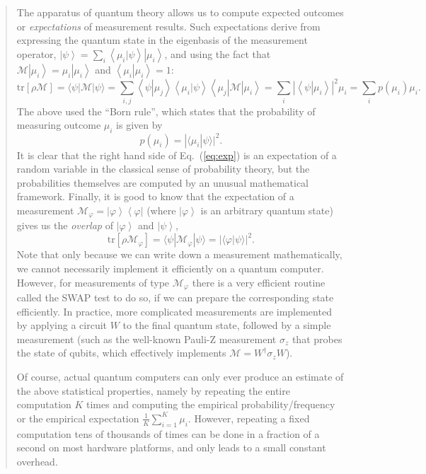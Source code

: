 \documentclass[aps, reprint, onecolumn, nofootinbib, longbibliography]{revtex4-2}
\newcommand{\ket}[1]{\ensuremath{\left| #1 \right \rangle}}
\newcommand{\bra}[1]{\ensuremath{\left \langle #1 \right |}}
\newcommand{\braket}[2]{\ensuremath{\left\langle #1\left|#2 \right.\right\rangle}}
\newcommand{\ketbra}[2]{\ket{#1}\!\bra{#2}}
\newcommand{\tr}[1]{ \mathrm{tr}\left[#1\right] }
\newcommand{\meas}{\mathcal{M}}
\begin{document}
\begin{quote}
    The apparatus of quantum theory allows us to compute expected outcomes or \textit{expectations} of measurement results. Such expectations derive from expressing the quantum state in the eigenbasis of the measurement operator, $\ket{\psi} = \sum_i \braket{\mu_i}{\psi} \ket{\mu_i}$, and using the fact that $\meas \ket{\mu_i} = \mu_i \ket{\mu_i}$ and $\braket{\mu_i}{\mu_i}=1$: 
    \begin{equation} \label{eq:exp}
    \tr{\rho \meas } = \langle \psi | \meas | \psi \rangle = \sum_{i,j} \braket{\psi}{\mu_j} \braket{\mu_i}{\psi} \bra{\mu_j} \meas   \ket{\mu_i}  =  \sum_{i} |\braket{\psi}{\mu_i}|^2 \mu_i = \sum_{i}p(\mu_i) \mu_i.
    \end{equation}
    The above used the ``Born rule'', which states that the probability of measuring outcome $\mu_i$ is given by 
    \begin{equation} \label{eq:probs}
        p(\mu_i) = |\langle \mu_i | \psi \rangle|^2.
    \end{equation}
    It is clear that the right hand side of Eq.~(\ref{eq:exp}) is an expectation of a random variable in the classical sense of probability theory, but the probabilities themselves are computed by an unusual mathematical framework. Finally, it is good to know that the expectation of a measurement $\meas_{\varphi} = \ketbra{\varphi}{\varphi}$ (where $\ket{\varphi}$ is an arbitrary quantum state) gives us the \textit{overlap} of $\ket{\varphi}$ and $\ket{\psi}$, 
    \begin{equation} \label{eq:overlap}
        \tr{\rho \meas_{\varphi}} = \langle \psi | \meas_{\varphi} | \psi \rangle = |\langle \varphi | \psi \rangle|^2.
    \end{equation}
    Note that only because we can write down a measurement mathematically, we cannot necessarily implement it efficiently on a quantum computer. However, for measurements of type $\meas_{\varphi}$ there is a very efficient routine called the SWAP test to do so, if we can prepare the corresponding state efficiently. In practice, more complicated measurements are implemented by applying a circuit $W$ to the final quantum state, followed by a simple measurement (such as the well-known Pauli-Z measurement $\sigma_z$ that probes the state of qubits, which effectively implements $\meas = W^{\dagger} \sigma_z W$). 
    
    Of course, actual quantum computers can only ever produce an estimate of the above statistical properties, namely by repeating the entire computation $K$ times and computing the empirical probability/frequency or the empirical expectation $\frac{1}{K} \sum_{i=1}^K \mu_i$. However, repeating a fixed computation tens of thousands of times can be done in a fraction of a second on most hardware platforms, and only leads to a small constant overhead.
\end{quote}
\end{document}
